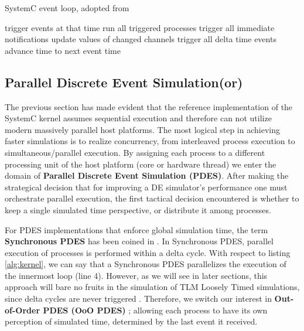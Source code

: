 \documentclass[12pt,twoside]{article}
\begin{document}
\begin{algorithm}[H]
\caption{SystemC event loop, adopted from \cite{Schumacher2010}}
\label{alg:kernel}
\begin{algorithmic}[1]

     
      \State trigger events at that time
         
             \State run all triggered processes
             \State trigger all immediate notifications
         \EndWhile
         \State update values of changed channels
         \State trigger all delta time events
       \EndWhile
       \State advance time to next event time
   \EndWhile

\end{algorithmic}
\end{algorithm}



\subsection{Parallel Discrete Event Simulation(or)}
\label{sec-4-4}
The previous section has made evident that the reference implementation of the SystemC kernel assumes sequential execution and therefore can not utilize modern massively parallel host platforms. 
The most logical step in achieving faster simulations is to realize concurrency, from interleaved process execution to simultaneous/parallel execution.
By assigning each process to a different processing unit of the host platform (core or hardware thread) we enter the domain of \textbf{Parallel Discrete Event Simulation (PDES)}.
After making the strategical decision that for improving a DE simulator's performance one must orchestrate parallel execution, 
the first tactical decision encountered
is whether to keep a single simulated time perspective, 
or distribute it among processes.

For PDES implementations that enforce global simulation time, the term \textbf{Synchronous PDES} has been coined in \cite{Schumacher2010}.
In Synchronous PDES, parallel execution of processes is performed within a delta cycle. 
With respect to listing \ref{alg:kernel}, we can say that a Synchronous PDES parallelizes the execution of the innermost loop (line 4).
However, as we will see in later sections, this approach will bare no fruits in the simulation of TLM Loosely Timed simulations, since delta cycles are never triggered \cite{Chen2012}.
Therefore, we switch our interest in \textbf{Out-of-Order PDES (OoO PDES)} \cite{Chen2015}; 
allowing each process to have its own perception of simulated time, determined by the last event it received.
\end{document}

